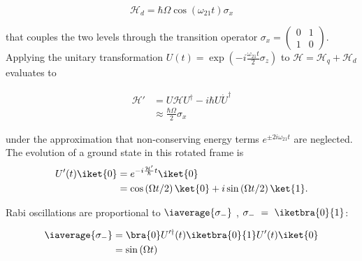 \begin{thebibliography}{99}
  \begin{equation}
    \label{eq:rabi2}
    \mathcal{H}_{d} = \hbar\Omega\cos(\omega_{21}t)\sigma_{x}
  \end{equation}

  \noindent    that   couples    the   two    levels   through    the   transition    operator
  $\sigma_x =  \ensuremath{\left(\begin{smallmatrix} 0 &  1 \\  1 & 0  \end{smallmatrix}\right)} $.
  Applying                    the                    unitary                    transformation
  $      U(t)       =      \exp      \left(-i      \frac{\omega_{21}t}{2}\sigma_z\right)       $      to
  $ \mathcal{H} = \mathcal{H}_{q}+\mathcal{H}_{d} $ evaluates to

  \begin{equation}
    \label{eq:rabi3}
    \begin{aligned}
      \mathcal{H}'& = U\mathcal{H}U^{\dag} - i\hbar U\dot{U}^{\dag}\\
      & \approx \frac{\hbar\Omega}{2}\sigma_x
    \end{aligned}
  \end{equation}

  \noindent     under    the     approximation     that     non-conserving    energy     terms
  $ e^{\pm 2i\omega_{21}t} $  are neglected. The evolution of a ground state  in this rotated frame
  is
  \begin{equation}
    \label{eq:rabi4}
    \begin{aligned}
      U'(t)\iket{0} & = e^{-i\frac{\mathcal{H'}}{\hbar}t}\iket{0} \\
      & = \cos\left({\Omega t}/{2}\right)\ket{0}+i\sin\left({\Omega t}/{2}\right)\ket{1}.
    \end{aligned}
  \end{equation}

  \noindent   Rabi    oscillations   are    proportional   to   $    \iaverage{\sigma_{-}}   $
  \cite{Astafiev2010}, $\sigma_{-}~=~\iketbra{0}{1}$:

  \begin{equation}
    \label{eq:rabi5}
    \begin{aligned}
      \iaverage{\sigma_{-}} & = \bra{0}U'^{\dag}(t) \iketbra{0}{1} U'(t)\iket{0}\\
      & = \sin \left(\Omega t\right)
    \end{aligned}
  \end{equation}


\end{thebibliography}
